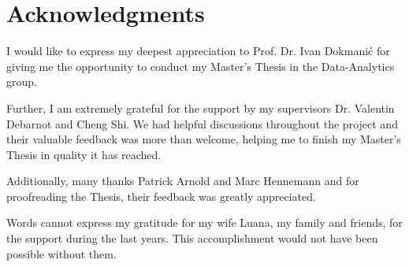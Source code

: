 \chapter{Acknowledgments}

I would like to express my deepest appreciation to Prof. Dr. Ivan Dokmanić
for giving me the opportunity to conduct my Master's Thesis in the 
Data-Analytics group.

\bigskip

Further, I am extremely grateful for the support by my supervisors
Dr. Valentin Debarnot and Cheng Shi. We had helpful discussions
throughout the project and their valuable feedback was more than welcome,
helping me to finish my Master's Thesis in quality it has reached.

\bigskip
Additionally, many thanks Patrick Arnold and Marc Hennemann and for 
proofreading the Thesis, their feedback was greatly appreciated.

\bigskip
Words cannot express my gratitude for my wife Luana, my family and friends,
for the support during the last years.
This accomplishment would not have been possible without them.